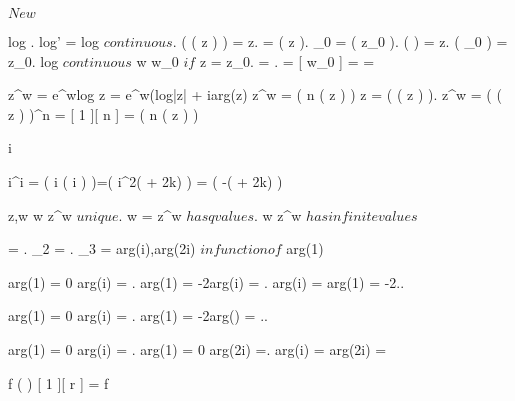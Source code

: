 \documentclass[../Main/main]{subfiles}
\begin{document}
\unit{ $ New $ }
{

	{
		{
			\function{ log }{ \C \setminus e^{i\alpha}(-\infty,0] }{ B_\alpha }
		}
		\holds
		{
			log \in \Hc.
			log' = 
		}
		\demonstration
		{
			log $ continuous $.
			\exp( \log( z ) ) = z.
			\omega = \log( z ).
			\omega_0 = \log( z_0 ).
			\exp( \omega ) = z.
			\exp( \omega_0 ) = z_0.
			log $ continuous $ \imp w \convergesto w_0 $ if $ z = z_0.
			 = .
			 = [ w_0 ] =  = 
		}
	}
	
	
	{
		{
			z^w = e^{wlog z} = e^{w(log|z| + iarg(z)}
		}
		\holds
		{
			z^w = \exp( n \log( z ) )
		}
		\demonstration
		{
			z = \exp( \log( z ) ).
			z^w = \exp( \log( z ) )^n = [ 1 ][ n ] = \exp( n \log( z ) )
		}
	}
	
	
	{
		{
			i \in \C
		}
		{
			{
				i^i = \exp( i \log( i ) )=\exp( i^2( + 2k\pi) ) = \exp( -( + 2k\pi) )
			}
			
		}
	}
	
	
	{
		{
			z,w \in \C
		}
		\holds
		{
			w \in \Z \imp z^w $ unique $.
			w =  \in \Q \imp z^w $ has q values $.
			w \in \R \setminus \Q \imp z^w $ has infinite values $ 
		}
	}
	
	
	{
		{
			\Omega = \C \setminus {}.
			\Omega_2 = \C \setminus {}.
			\Omega_3 = \C \setminus {} \cup {} \cup {}
		}
		\study
		{
			arg(i),arg(2i) $ in function of $ arg(1)
		}	
		\start
		{
			arg(1) = 0 \imp arg(i) = .
			arg(1) = -2\pi \imp arg(i) = .
			arg(i) =  \imp arg(1) = -2\pi..

			
			arg(1) = 0 \imp arg(i) = .
			arg(1) = -2\pi \imp arg(\pi) = \frac{ -7\pi }{ 2 }..

			arg(1) = 0 \imp arg(i) = \frac{ \pi }{ 2 }.
			arg(1) = 0 \imp arg(2i) =\frac{ -3\pi }{ 2 }.
			arg(i) =  \imp arg(2i) = 
		}
	}
	
	
	{
		{
			f \in \rational( \C )
		}
		{
			[ 1 ][ r ] = f
		}
	}
	
	
	
	
	
	
	

}
\end{document}
